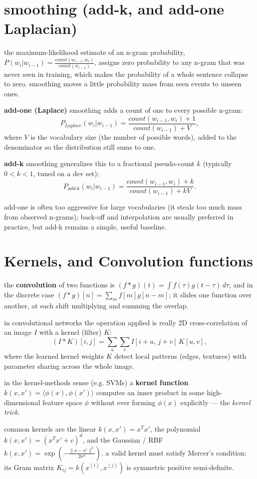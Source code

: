 \documentclass[4apaper,12pt]{book}
\begin{document}
\begin{appendices}
  \chapter{smoothing (add-k, and add-one Laplacian)}
  \begin{description}
  \item the maximum-likelihood estimate of an n-gram probability, $P(w_i|w_{i-1})=\frac{count(w_{i-1},w_i)}{count(w_{i-1})}$, assigns zero probability to any n-gram that was never seen in training, which makes the probability of a whole sentence collapse to zero. smoothing moves a little probability mass from seen events to unseen ones.
  \item \textbf{add-one (Laplace)} smoothing adds a count of one to every possible n-gram: $$P_{Laplace}(w_i|w_{i-1})=\frac{count(w_{i-1},w_i)+1}{count(w_{i-1})+V},$$ where $V$ is the vocabulary size (the number of possible words), added to the denominator so the distribution still sums to one.
  \item \textbf{add-k} smoothing generalizes this to a fractional pseudo-count $k$ (typically $0<k<1$, tuned on a dev set): $$P_{add\text{-}k}(w_i|w_{i-1})=\frac{count(w_{i-1},w_i)+k}{count(w_{i-1})+kV}.$$
  \item add-one is often too aggressive for large vocabularies (it steals too much mass from observed n-grams); back-off and interpolation are usually preferred in practice, but add-k remains a simple, useful baseline.
    \end{description}
  \chapter{Kernels, and Convolution functions}
  \begin{description}
  \item the \textbf{convolution} of two functions is $(f*g)(t)=\int f(\tau)g(t-\tau)\,d\tau$, and in the discrete case $(f*g)[n]=\sum_{m}f[m]g[n-m]$; it slides one function over another, at each shift multiplying and summing the overlap.
  \item in convolutional networks the operation applied is really 2D cross-correlation of an image $I$ with a kernel (filter) $K$: $$(I*K)[i,j]=\sum_{u}\sum_{v}I[i+u,\,j+v]\,K[u,v],$$ where the learned kernel weights $K$ detect local patterns (edges, textures) with parameter sharing across the whole image.
  \item in the kernel-methods sense (e.g. SVMs) a \textbf{kernel function} $k(x,x')=\langle\phi(x),\phi(x')\rangle$ computes an inner product in some high-dimensional feature space $\phi$ without ever forming $\phi(x)$ explicitly --- the \textit{kernel trick}.
  \item common kernels are the linear $k(x,x')=x^Tx'$, the polynomial $k(x,x')=(x^Tx'+c)^d$, and the Gaussian / RBF $k(x,x')=\exp\!\left(-\frac{\|x-x'\|^2}{2\sigma^2}\right)$. a valid kernel must satisfy Mercer's condition: its Gram matrix $K_{ij}=k(x^{(i)},x^{(j)})$ is symmetric positive semi-definite.
    \end{description}
\end{appendices}
\end{document}
